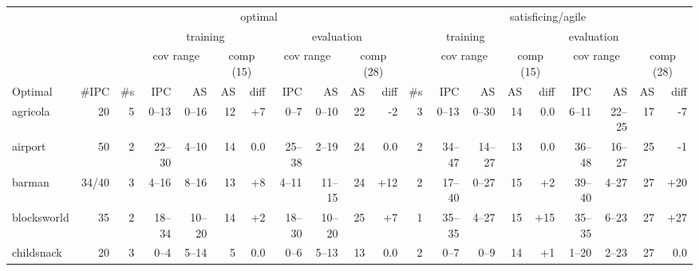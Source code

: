 \documentclass{article}
\begin{document}
                
                        \begin{table} \centering \scriptsize \setlength{\tabcolsep}{2pt}
                        \begin{tabular}{l@{}rr|rrrr|rrrr|r|rrrr|rrrr}
& & \multicolumn{9}{c}{optimal} & \multicolumn{9}{c}{satisficing/agile} \\
\cmidrule[\lightrulewidth](){3-11}
\cmidrule[\lightrulewidth](l){12-20}
& & & \multicolumn{4}{c}{training} & \multicolumn{4}{c}{evaluation} & \multicolumn{4}{c}{training} & \multicolumn{4}{c}{evaluation}\\
\cmidrule[\lightrulewidth](){4-7}
\cmidrule[\lightrulewidth](l){8-11}
\cmidrule[\lightrulewidth](){13-16}
\cmidrule[\lightrulewidth](l){17-20}
& & & \multicolumn{2}{c}{cov range} & \multicolumn{2}{c}{comp (15)} & \multicolumn{2}{c}{cov range} & \multicolumn{2}{c}{comp (28)} & & \multicolumn{2}{c}{cov range} & \multicolumn{2}{c}{comp (15)} & \multicolumn{2}{c}{cov range} & \multicolumn{2}{c}{comp (28)} \\
\cmidrule[\lightrulewidth](){4-5}
\cmidrule[\lightrulewidth](l){6-7}
\cmidrule[\lightrulewidth](l){8-9}
\cmidrule[\lightrulewidth](l){10-11}
\cmidrule[\lightrulewidth](){13-14}
\cmidrule[\lightrulewidth](l){15-16}
\cmidrule[\lightrulewidth](l){17-18}
      Optimal & \#IPC & \#s &     IPC &     AS & AS &             diff &     IPC &     AS & AS &              diff & \#s &      IPC &     AS & AS &              diff &      IPC &     AS & AS &              diff \\
\midrule
     agricola &    20 &   5 &   0--13 &  0--16 & 12 & {\color{blue}+7} &    0--7 &  0--10 & 22 &   {\color{red}-2} &   3 &    0--13 &  0--30 & 14 &               0.0 &    6--11 & 22--25 & 17 &   {\color{red}-7} \\
      airport &    50 &   2 &  22--30 &  4--10 & 14 &              0.0 &  25--38 &  2--19 & 24 &               0.0 &   2 &   34--47 & 14--27 & 13 &               0.0 &   36--48 & 16--27 & 25 &   {\color{red}-1} \\
       barman & 34/40 &   3 &   4--16 &  8--16 & 13 & {\color{blue}+8} &   4--11 & 11--15 & 24 & {\color{blue}+12} &   2 &   17--40 &  0--27 & 15 &  {\color{blue}+2} &   39--40 &  4--27 & 27 & {\color{blue}+20} \\
  blocksworld &    35 &   2 &  18--34 & 10--20 & 14 & {\color{blue}+2} &  18--30 & 10--20 & 25 &  {\color{blue}+7} &   1 &   35--35 &  4--27 & 15 & {\color{blue}+15} &   35--35 &  6--23 & 27 & {\color{blue}+27} \\
   childsnack &    20 &   3 &    0--4 &  5--14 &  5 &              0.0 &    0--6 &  5--13 & 13 &               0.0 &   2 &     0--7 &   0--9 & 14 &  {\color{blue}+1} &    1--20 &  2--23 & 27 &               0.0 \\

\end{tabular}
\end{table}
\end{document}
